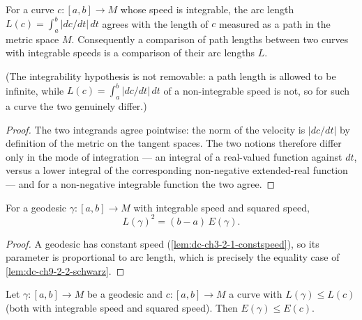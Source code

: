 \begin{lemma}
  \label{lem:dc-ch9-2-3-arclength-bridge}
  \leanok
  For a curve $c:[a,b]\to M$ whose speed is integrable, the arc length
  $L(c)=\int_a^b|dc/dt|\,dt$ agrees with the length of $c$
  measured as a path in the metric space $M$. Consequently a comparison of path lengths
  between two curves with integrable speeds is a comparison of their arc lengths $L$.

  (The integrability hypothesis is not removable: a path length is allowed to be infinite,
  while $L(c)=\int_a^b|dc/dt|\,dt$ of a non-integrable speed is not, so for such a curve the
  two genuinely differ.)
\end{lemma}
\begin{proof}
  \leanok
  \sketch
  The two integrands agree pointwise: the norm of the velocity is $|dc/dt|$ by definition of
  the metric on the tangent spaces. The two notions therefore differ only in the mode of
  integration --- an integral of a real-valued function against $dt$, versus a lower integral
  of the corresponding non-negative extended-real function --- and for a non-negative
  integrable function the two agree.
\end{proof}
\begin{lemma}
  \label{lem:dc-ch9-2-3-geodesic-equality}
  \leanok
  For a geodesic $\gamma:[a,b]\to M$ with integrable speed and squared speed,
  $$
  L(\gamma)^2 = (b-a)\,E(\gamma).
  $$
\end{lemma}
\begin{proof}
  \leanok
  \sketch
  A geodesic has constant speed (\cref{lem:dc-ch3-2-1-constspeed}), so its parameter is
  proportional to arc length, which is precisely the equality case of
  \cref{lem:dc-ch9-2-2-schwarz}.

\end{proof}
\begin{lemma}
  \label{lem:dc-ch9-2-3-inequality}
  \leanok
  Let $\gamma:[a,b]\to M$ be a geodesic and $c:[a,b]\to M$ a curve with $L(\gamma)\le L(c)$
  (both with integrable speed and squared speed). Then $E(\gamma)\le E(c)$.

\end{lemma}
